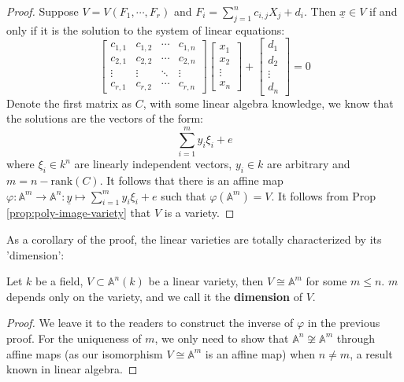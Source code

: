 \documentclass{note-eng}
\begin{document}
\begin{proof}
    Suppose $V = V(F_1, \cdots, F_r)$ and $F_i = \sum\limits_{j = 1}^{n} c_{i, j} X_j + d_i$. Then $\underline{x} \in V$ if and only if it is the solution to the system of linear equations:
    $$
        \begin{bmatrix}
            c_{1, 1} & c_{1, 2} & \cdots &c_{1, n} \\
            c_{2, 1} & c_{2, 2} & \cdots &c_{2, n} \\
            \vdots &\vdots & \ddots &\vdots \\
            c_{r, 1} & c_{r, 2} & \cdots &c_{r, n}
        \end{bmatrix}
        \begin{bmatrix}
            x_1 \\
            x_2 \\
            \vdots \\
            x_n
        \end{bmatrix} + 
        \begin{bmatrix}
            d_1 \\
            d_2 \\
            \vdots \\
            d_n
        \end{bmatrix} = 0
    $$
    Denote the first matrix as $C$, with some linear algebra knowledge, we know that the solutions are the vectors of the form:
    $$\sum\limits_{i = 1}^{m} y_i \xi_i + e$$
    where $\xi_i \in k^n$ are linearly independent vectors, $y_i \in k$ are arbitrary and $m = n - \mathrm{rank}(C)$. It follows that there is an affine map $\varphi: \mathbb{A}^{m} \rightarrow \mathbb{A}^n: \underline{y} \mapsto \sum\limits_{i = 1}^{m} y_i \xi_i + e$ such that $\varphi(\mathbb{A}^m) = V$. It follows from Prop \ref{prop:poly-image-variety} that $V$ is a variety.
\end{proof}

As a corollary of the proof, the linear varieties are totally characterized by its 'dimension':

\begin{corollary}
    Let $k$ be a field, $V \subset \mathbb{A}^n(k)$ be a linear variety, then $V \cong \mathbb{A}^m$ for some $m \le n$. $m$ depends only on the variety, and we call it the \textbf{dimension} of $V$.
\end{corollary}

\begin{proof}
    We leave it to the readers to construct the inverse of $\varphi$ in the previous proof. For the uniqueness of $m$, we only need to show that $\mathbb{A}^n \not \cong \mathbb{A}^m$ through affine maps (as our isomorphism $V \cong \mathbb{A}^m$ is an affine map) when $n \ne m$, a result known in linear algebra.
\end{proof}
\end{document}
